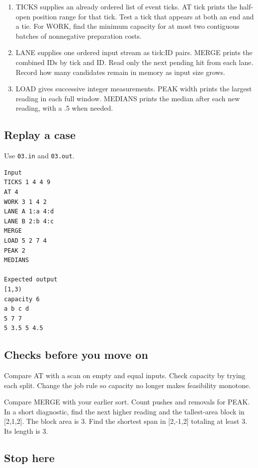 \documentclass[11pt,letterpaper]{article}
\begin{document}
\begin{enumerate}
\item TICKS supplies an already ordered list of event ticks. AT tick prints the half-open position range for that tick. Test a tick that appears at both an end and a tie. For WORK, find the minimum capacity for at most two contiguous batches of nonnegative preparation costs.
\item LANE supplies one ordered input stream as tick:ID pairs. MERGE prints the combined IDs by tick and ID. Read only the next pending hit from each lane. Record how many candidates remain in memory as input size grows.
\item LOAD gives successive integer measurements. PEAK width prints the largest reading in each full window. MEDIANS prints the median after each new reading, with a .5 when needed.
\end{enumerate}

\subsection*{Replay a case}

Use \texttt{03.in} and \texttt{03.out}.

\begin{samepage}
\small
\begin{verbatim}
Input
TICKS 1 4 4 9
AT 4
WORK 3 1 4 2
LANE A 1:a 4:d
LANE B 2:b 4:c
MERGE
LOAD 5 2 7 4
PEAK 2
MEDIANS

Expected output
[1,3)
capacity 6
a b c d
5 7 7
5 3.5 5 4.5
\end{verbatim}
\end{samepage}

\subsection*{Checks before you move on}

Compare AT with a scan on empty and equal inputs. Check capacity by trying each split. Change the job rule so capacity no longer makes feasibility monotone.

Compare MERGE with your earlier sort. Count pushes and removals for PEAK. In a short diagnostic, find the next higher reading and the tallest-area block in [2,1,2]. The block area is 3. Find the shortest span in [2,-1,2] totaling at least 3. Its length is 3.

\subsection*{Stop here}
\end{document}
